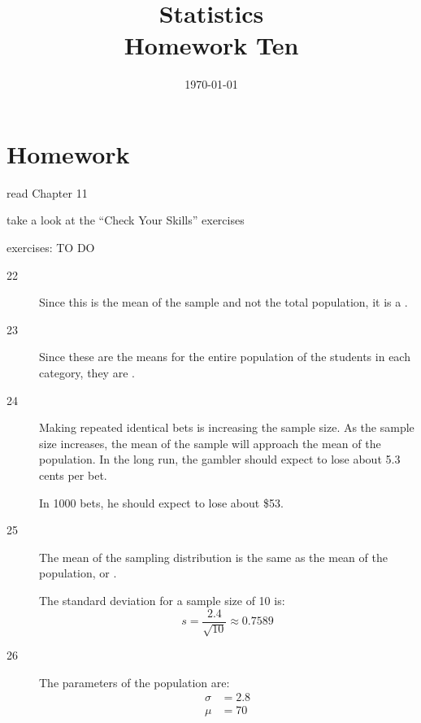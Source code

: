 \documentclass[letterpaper, landscape]{exam}
\title{Statistics \\ Homework Ten}
\date{\today}
\author{}
\begin{document}
  \maketitle

  \section{Homework}
  \ifprintanswers
  \else
    \begin{itemize*}
      \item read Chapter 11 
      \item take a look at the ``Check Your Skills'' exercises
      \item exercises: TO DO
    \end{itemize*}
  \fi

  \ifprintanswers
    \begin{description}

      \item[22] Since this is the mean of the sample and not the total
        population, it is a .

      \item[23] Since these are the means for the entire population of the
        students in each category, they are .

      \item[24] Making repeated identical bets is increasing the sample size.
        As the sample size increases, the mean of the sample will approach the
        mean of the population. In the long run, the gambler should expect to
        lose about 5.3 cents per bet.

        In 1000 bets, he should expect to lose about \$53. 

      \item[25] The mean of the sampling distribution is the same as the mean of
        the population, or .

        The standard deviation for a sample size of 10 is:
        \[
          s = \frac{2.4}{\sqrt{10}} \approx \boxed{ 0.7589 }
        \]

      \item[26]
        The parameters of the population are:
        \begin{align*}
          \sigma & = 2.8 \\
          \mu    & = 70 \\
        \end{align*}


\end{description}
\end{document}
